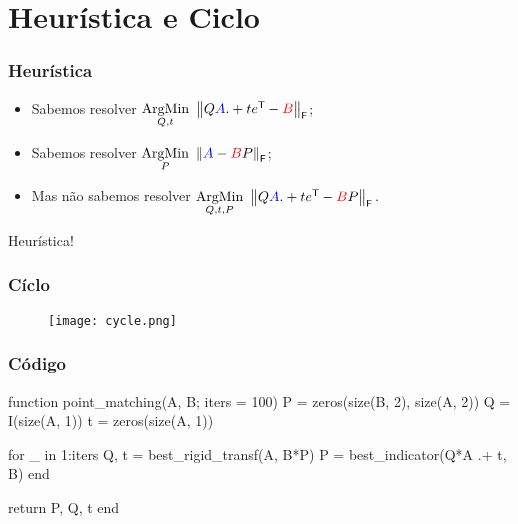 
\section{Heurística e Ciclo}

\begin{frame}[fragile]
  \frametitle{Heurística}
  \begin{itemize}
    \item Sabemos resolver $\underset{Q,t}{\text{ArgMin}}\,\, \left\lVert Q\textcolor{blue}{A} .+ t e^{\mathsf{T}\mkern-1mu} - \textcolor{red}{B}\right\rVert_\mathsf{F}$; \vspace{1cm}
    \item Sabemos resolver $\underset{P}{\text{ArgMin}}\,\, \left\lVert\textcolor{blue}{A} - \textcolor{red}{B}P\right\rVert_\mathsf{F}$; \vspace{1cm}
    \item Mas não sabemos resolver $\underset{Q,t,P}{\text{ArgMin}}\,\, \left\lVert Q\textcolor{blue}{A} .+ t e^{\mathsf{T}\mkern-1mu} - \textcolor{red}{B}P\right\rVert_\mathsf{F}.$
  \end{itemize}
  \vspace{1cm}
  \begin{center}
    Heurística!
  \end{center}
\end{frame}

\begin{frame}
  \frametitle{Cíclo}
  \begin{figure}
    \centering
    \texttt{[image: cycle.png]}
  \end{figure}
\end{frame}

\begin{frame}[fragile]
  \frametitle{Código}
  \begin{code}
    function point_matching(A, B; iters = 100)
      P = zeros(size(B, 2), size(A, 2))
      Q = I(size(A, 1))
      t = zeros(size(A, 1))

      for _ in 1:iters
        Q, t = best_rigid_transf(A, B*P)
        P = best_indicator(Q*A .+ t, B)
      end

      return P, Q, t
    end
  \end{code}
\end{frame}
